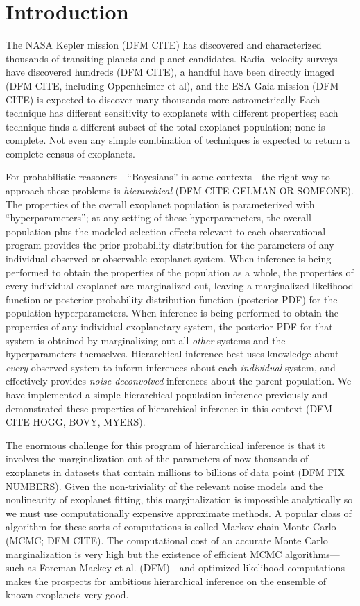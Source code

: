 \documentclass[12pt,preprint]{aastex}
\newcommand{\project}[1]{{\sffamily #1}}
\begin{document}
\section{Introduction}

The NASA \project{Kepler} mission (DFM CITE) has discovered and
characterized thousands of transiting planets and planet
candidates.
Radial-velocity surveys have discovered hundreds (DFM
CITE), a handful have been directly imaged (DFM CITE, including
Oppenheimer et al), and the ESA \project{Gaia} mission (DFM CITE) is
expected to discover many thousands more astrometrically
Each technique has different sensitivity to exoplanets with different
properties; each technique finds a different subset of the total
exoplanet population; none is complete.
Not even any simple combination of techniques is expected to return a
complete census of exoplanets.

For probabilistic reasoners---``Bayesians'' in some contexts---the
right way to approach these problems is \emph{hierarchical} (DFM CITE
GELMAN OR SOMEONE).
The properties of the overall exoplanet population is parameterized with
``hyperparameters''; at any setting of these hyperparameters, the overall
population plus the modeled selection effects relevant to each observational
program provides the prior probability distribution for the parameters of any
individual observed or observable exoplanet system.
When inference is being performed to obtain the properties of the population
as a whole, the properties of every individual exoplanet are marginalized out,
leaving a marginalized likelihood function or posterior probability
distribution function (posterior PDF) for the population
hyperparameters.
When inference is being performed to obtain the
properties of any individual exoplanetary system, the posterior PDF
for that system is obtained by marginalizing out all \emph{other}
systems and the hyperparameters themselves.
Hierarchical inference
best uses knowledge about \emph{every} observed system to inform
inferences about each \emph{individual} system, and effectively
provides \emph{noise-deconvolved} inferences about the parent
population.
We have implemented a simple hierarchical population
inference previously and demonstrated these properties of hierarchical
inference in this context (DFM CITE HOGG, BOVY, MYERS).

The enormous challenge for this program of hierarchical inference is
that it involves the marginalization out of the parameters of now
thousands of exoplanets in datasets that contain millions to billions
of data point (DFM FIX NUMBERS).
Given the non-triviality of the
relevant noise models and the nonlinearity of exoplanet fitting, this
marginalization is impossible analytically so we must use computationally
expensive approximate methods.
A popular class of algorithm for these sorts
of computations is called Markov chain Monte Carlo (MCMC; DFM CITE).
The computational cost of an accurate Monte Carlo marginalization is very
high but the existence of efficient MCMC algorithms---such as Foreman-Mackey
et al. (DFM)---and optimized likelihood computations makes the prospects for
ambitious hierarchical inference on the ensemble of known exoplanets very
good.
\end{document}

